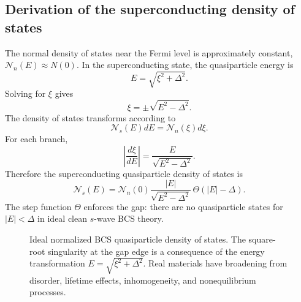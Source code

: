 \documentclass[11pt]{article}
\numberwithin{equation}{section}
\newcommand{\Nzero}{N(0)}
\newcommand{\DOS}{\mathcal{N}}
\begin{document}
\subsection{Derivation of the superconducting density of states}

The normal density of states near the Fermi level is approximately constant, $\DOS_n(E)\approx \Nzero$. In the superconducting state, the quasiparticle energy is
\begin{equation}
E=\sqrt{\xi^2+\Delta^2}.
\end{equation}
Solving for $\xi$ gives
\begin{equation}
\xi=\pm\sqrt{E^2-\Delta^2}.
\end{equation}
The density of states transforms according to
\begin{equation}
\DOS_s(E)dE=\DOS_n(\xi)d\xi.
\end{equation}
For each branch,
\begin{equation}
\left|\frac{d\xi}{dE}\right|=\frac{E}{\sqrt{E^2-\Delta^2}}.
\end{equation}
Therefore the superconducting quasiparticle density of states is
\begin{equation}
\boxed{\DOS_s(E)=\DOS_n(0)\frac{|E|}{\sqrt{E^2-\Delta^2}}\,\Theta(|E|-\Delta).}
\label{eq:bcs_dos}
\end{equation}
The step function $\Theta$ enforces the gap: there are no quasiparticle states for $|E|<\Delta$ in ideal clean $s$-wave BCS theory.

\begin{figure}[H]
\centering
{}
\caption{Ideal normalized BCS quasiparticle density of states. The square-root singularity at the gap edge is a consequence of the energy transformation $E=\sqrt{\xi^2+\Delta^2}$. Real materials have broadening from disorder, lifetime effects, inhomogeneity, and nonequilibrium processes.}
\end{figure}
\end{document}
